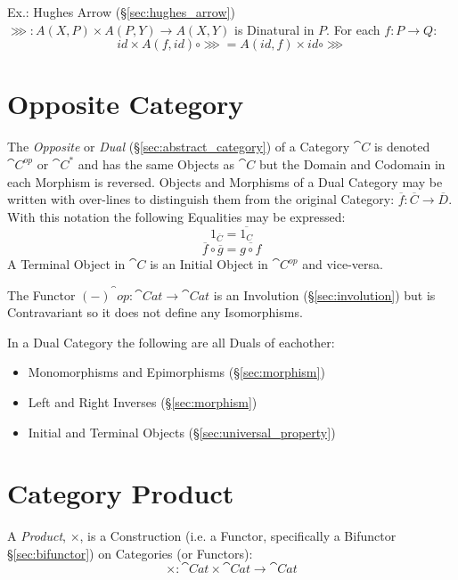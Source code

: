 Ex.: Hughes Arrow (\S\ref{sec:hughes_arrow}) $\ggg : A (X,P) \times A
(P,Y) \rightarrow A (X,Y)$ is Dinatural in $P$. For each $f : P
\rightarrow Q$:
\[
  id \times A(f,id) \circ \ggg = A(id,f) \times id \circ \ggg
\]



\section{Opposite Category}\label{sec:opposite_category}

The \emph{Opposite} or \emph{Dual} (\S\ref{sec:abstract_category})
of a Category $\cat{C}$ is denoted $\cat{C^{op}}$ or
$\cat{C^*}$ and has the same Objects as $\cat{C}$ but the Domain
and Codomain in each Morphism is reversed. Objects and Morphisms of a
Dual Category may be written with over-lines to distinguish them from
the original Category: $\overline{f}: \overline{C} \rightarrow
\overline{D}$. With this notation the following Equalities may be
expressed:
\[
  1_{\overline{C}} = \overline{1_C}
\]\[
  \overline{f} \circ \overline{g} = \overline{g \circ f}
\]
A Terminal Object in $\cat{C}$ is an Initial Object in
$\cat{C^{op}}$ and vice-versa.

The Functor $(-)^\cat{op} : \cat{Cat} \rightarrow \cat{Cat}$
is an Involution (\S\ref{sec:involution}) but is Contravariant so it
does not define any Isomorphisms.

In a Dual Category the following are all Duals of eachother:
\begin{itemize}
  \item Monomorphisms and Epimorphisms (\S\ref{sec:morphism})
  \item Left and Right Inverses (\S\ref{sec:morphism})
  \item Initial and Terminal Objects (\S\ref{sec:universal_property})
\end{itemize}



\section{Category Product}\label{sec:category_product}

A \emph{Product}, $\times$, is a Construction (i.e. a Functor,
specifically a Bifunctor \S\ref{sec:bifunctor}) on Categories (or
Functors):
\[
  \times : \cat{Cat} \times \cat{Cat} \rightarrow \cat{Cat}
\]

